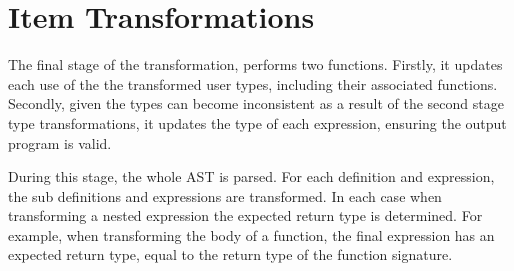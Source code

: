 \documentclass[ oneside,%
                    author={James Elgar},
                    degree={MEng},
                     title={Bidirectional transformer between functional and \\ object-oriented programming in Rust},
                  subtitle={}]{dissertation}
\begin{document}



\section{Item Transformations}
\label{sec:item-trans}

The final stage of the transformation, performs two functions. Firstly, it updates each use of the the transformed user types, including their associated functions. Secondly, given the types can become inconsistent as a result of the second stage type transformations, it updates the type of each expression, ensuring the output program is valid.


During this stage, the whole AST is parsed. For each definition and expression, the sub definitions and expressions are transformed. In each case when transforming a nested expression the expected return type is determined. For example, when transforming the body of a function, the final expression has an expected return type, equal to the return type of the function signature. 

\end{document}

